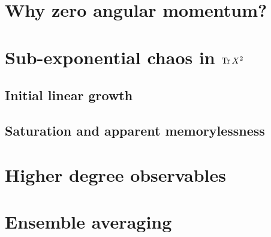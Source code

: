 \section{Why zero angular momentum?}

\section{Sub-exponential chaos in $\Tr X^2$}

\subsection{Initial linear growth}

\subsection{Saturation and apparent memorylessness}

\section{Higher degree observables}

\section{Ensemble averaging}